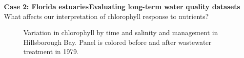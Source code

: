 \documentclass[serif]{beamer}\usepackage[]{graphicx}\usepackage[]{color}
\begin{document}
\begin{frame}{\textbf{Case 2: Florida estuaries}}{\textbf{Evaluating long-term water quality datasets}}
What affects our interpretation of chlorophyll response to nutrients?
\vspace{-0.1in}
\captionsetup[subfloat]{captionskip=0pt, position=top}
\begin{figure}
\centering
{}

\leavevmode{}
    \hspace{0pt plus 1filll}\null

\caption{Variation in chlorophyll by {\color{mypal5}\protect{}} time and {\color{mypal5}\protect{}} salinity and management in Hillsborough Bay.  Panel {\color{mypal5}\protect{}} is colored before and after wastewater treatment in 1979.}
\label{fig:salmoyr}
\end{figure}
\captionsetup[subfloat]{position=top}
\end{frame}
\end{document}
